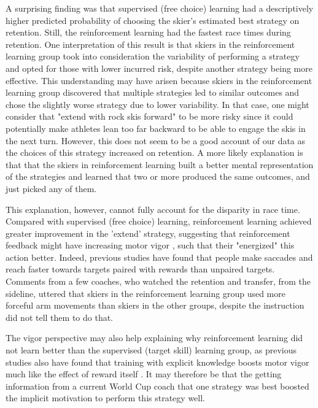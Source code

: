 \documentclass{article}
\begin{document}
A surprising finding was that supervised (free choice) learning had a descriptively higher predicted probability of choosing the skier's estimated best strategy on retention. Still, the reinforcement learning had the fastest race times during retention. One interpretation of this result is that skiers in the reinforcement learning group took into consideration the variability of performing a strategy and opted for those with lower incurred risk, despite another strategy being more effective. This understanding may have arisen because skiers in the reinforcement learning group discovered that multiple strategies led to similar outcomes and chose the slightly worse strategy due to lower variability. In that case, one might consider that "extend with rock skis forward" to be more risky since it could potentially make athletes lean too far backward to be able to engage the skis in the next turn. However, this does not seem to be a good account of our data as the choices of this strategy increased on retention. A more likely explanation is that that the skiers in reinforcement learning built a better mental representation of the strategies and learned that two or more produced the same outcomes, and just picked any of them.

This explanation, however, cannot fully account for the disparity in race time. Compared with supervised (free choice) learning, reinforcement learning achieved greater improvement in the 'extend' strategy, suggesting that reinforcement feedback might have increasing motor vigor \cite{pietro_mazzoni_why_2007, dudman_basal_2016}, such that their "energized" this action better. Indeed, previous studies have found that people make saccades \cite{takikawa_modulation_2002} and reach\cite{summerside_vigor_2018} faster towards targets paired with rewards than unpaired targets. Comments from a few coaches, who watched the retention and transfer, from the sideline, uttered that skiers in the reinforcement learning group used more forceful arm movements than skiers in the other groups, despite the instruction did not tell them to do that.

The vigor perspective may also help explaining why reinforcement learning did not learn better than the supervised (target skill) learning group, as previous studies also have found that training with explicit knowledge boosts motor vigor much like the effect of reward itself \cite{anderson_rewards_2020, wong_explicit_2015}. It may therefore be that the getting information from a current World Cup coach that one strategy was best boosted the implicit motivation to perform this strategy well. 
\end{document}
